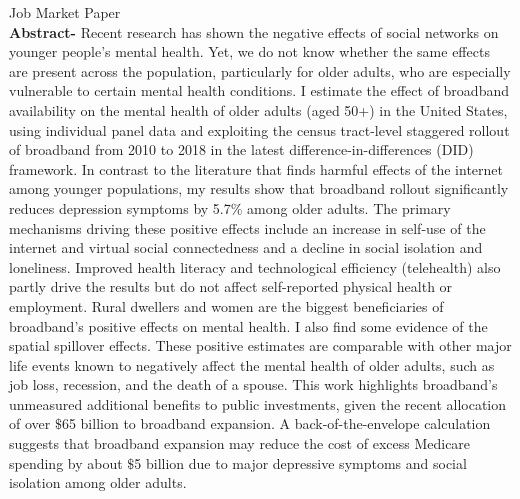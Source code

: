 \documentclass{resume} %
\begin{document}
\begin{rSection}{Job Market Paper}
\\
\textbf{Abstract-} 
Recent research has shown the negative effects of social networks on younger people's mental health. Yet, we do not know whether the same effects are present across the population, particularly for older adults, who are especially vulnerable to certain mental health conditions.
I estimate the effect of broadband availability on the mental health of older adults (aged 50+) in the United States, using individual panel data and exploiting the census tract-level staggered rollout of broadband from 2010 to 2018 in the latest difference-in-differences (DID) framework.
In contrast to the literature that finds harmful effects of the internet among younger populations, my results show that broadband rollout significantly reduces depression symptoms by 5.7\% among older adults. The primary mechanisms driving these positive effects include an increase in self-use of the internet and virtual social connectedness and a decline in social isolation and loneliness. Improved health literacy and technological efficiency (telehealth) also partly drive the results but do not affect self-reported physical health or employment.
Rural dwellers and women are the biggest beneficiaries of broadband's positive effects on mental health.
I also find some evidence of the spatial spillover effects.
These positive estimates are comparable with other major life events known to negatively affect the mental health of older adults, such as job loss, recession, and the death of a spouse. This work highlights broadband's unmeasured additional benefits to public investments, given the recent allocation of over $\$$65 billion to broadband expansion. A back-of-the-envelope calculation suggests that broadband expansion may reduce the cost of excess Medicare spending by about $\$$5 billion due to major depressive symptoms and social isolation among older adults.  

\end{rSection}
\end{document}
